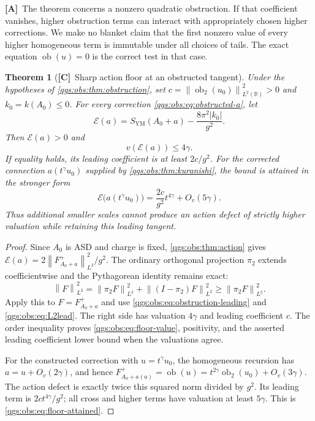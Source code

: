 \documentclass[11pt,oneside]{article}
\numberwithin{equation}{section}
\theoremstyle{plain}
\newtheorem{theorem}{Theorem}[section]
\theoremstyle{definition}
\theoremstyle{remark}
\newcommand{\R}{\mathbb R}
\newcommand{\ob}{\operatorname{ob}}
\newcommand{\SYM}{S_{\mathrm{YM}}}
\newcommand{\Oval}[1]{O_{v}(#1)}
\newcommand{\abs}[1]{\left|#1\right|}
\newcommand{\norm}[1]{\left\|#1\right\|}
\newcommand{\TC}{\textcolor{TierC}{\textsf{\bfseries[C]}}}
\newcommand{\TA}{\textcolor{TierA}{\textsf{\bfseries[A]}}}
\begin{document}
\TA\ The theorem concerns a nonzero quadratic obstruction. If that coefficient vanishes, higher obstruction terms can interact with appropriately chosen higher corrections. We make no blanket claim that the first nonzero value of every higher homogeneous term is immutable under all choices of tails. The exact equation $\ob(u)=0$ is the correct test in that case.

\begin{theorem}[\TC\ Sharp action floor at an obstructed tangent]\label{qgs:obs:thm:floor}
Under the hypotheses of \cref{qgs:obs:thm:obstruction}, set $c=\norm{\ob_2(u_0)}_{L^2(\R)}^2>0$ and $k_0=k(A_0)\le0$. For every correction \eqref{qgs:obs:eq:obstructed-a}, let
\[
 \mathcal E(a)=\SYM(A_0+a)-\frac{8\pi^2\abs{k_0}}{g^2}.
\]
Then $\mathcal E(a)>0$ and
\begin{equation}\label{qgs:obs:eq:floor-value}
 v(\mathcal E(a))\le4\gamma.
\end{equation}
If equality holds, its leading coefficient is at least $2c/g^2$. For the corrected connection $a(t^\gamma u_0)$ supplied by \cref{qgs:obs:thm:kuranishi}, the bound is attained in the stronger form
\begin{equation}\label{qgs:obs:eq:floor-attained}
 \mathcal E\bigl(a(t^\gamma u_0)\bigr)
 =\frac{2c}{g^2}t^{4\gamma}+\Oval{5\gamma}.
\end{equation}
Thus additional smaller scales cannot produce an action defect of strictly higher valuation while retaining this leading tangent.
\end{theorem}
\begin{proof}
Since $A_0$ is ASD and charge is fixed, \cref{qgs:obs:thm:action} gives $\mathcal E(a)=2\norm{F_{A_0+a}^+}_{L^2}^2/g^2$. The ordinary orthogonal projection $\pi_2$ extends coefficientwise and the Pythagorean identity remains exact:
\[
 \norm F_{L^2}^2=\norm{\pi_2F}_{L^2}^2+\norm{(I-\pi_2)F}_{L^2}^2
 \ge\norm{\pi_2F}_{L^2}^2.
\]
Apply this to $F=F_{A_0+a}^+$ and use \eqref{qgs:obs:eq:obstruction-leading} and \eqref{qgs:obs:eq:L2lead}. The right side has valuation $4\gamma$ and leading coefficient $c$. The order inequality proves \eqref{qgs:obs:eq:floor-value}, positivity, and the asserted leading coefficient lower bound when the valuations agree.

For the constructed correction with $u=t^\gamma u_0$, the homogeneous recursion has $a=u+\Oval{2\gamma}$, and hence $F_{A_0+a(u)}^+=\ob(u)=t^{2\gamma}\ob_2(u_0)+\Oval{3\gamma}$. The action defect is exactly twice this squared norm divided by $g^2$. Its leading term is $2ct^{4\gamma}/g^2$; all cross and higher terms have valuation at least $5\gamma$. This is \eqref{qgs:obs:eq:floor-attained}.
\end{proof}
\end{document}
